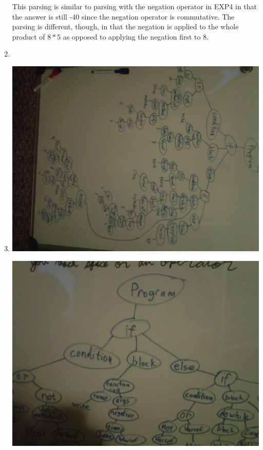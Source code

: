 \documentclass[landscape]{report}
\begin{document}
\begin{enumerate}
      This parsing is similar to parsing with the negation operator in EXP4 in
      that the answer is still -40 since the negation operator is commutative.
      The parsing is different, though, in that the negation is applied to the
      whole product of $8 * 5$ as opposed to applying the negation first to 8.
    \item %
      
    \item %
      \includegraphics[scale=0.4]{img/prob7_1.jpg}
      
      \includegraphics[scale=0.4]{img/prob7_2.jpg}
      

\end{enumerate}
\end{document}
